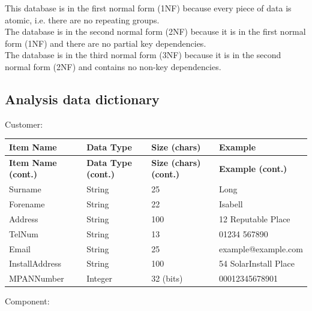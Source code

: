 This database is in the first normal form (1NF) because every piece of data is atomic, i.e. there are no repeating groups.\\
The database is in the second normal form (2NF) because it is in the first normal form (1NF) and there are no partial key dependencies.\\
The database is in the third normal form (3NF) because it is in the second normal form (2NF) and contains no non-key dependencies.
		\subsection{Analysis data dictionary}
Customer:

\begin{center}
	\begin{longtable}{ | p{4cm} | p{4cm} | p{4cm} | p{4cm} | }
		\hline
		\textbf{Item Name} & \textbf{Data Type} & \textbf{Size
(chars)} & \textbf{Example}\\
		\endfirsthead
		\hline
		\textbf{Item Name (cont.)} & \textbf{Data Type (cont.)} &
\textbf{Size (chars) (cont.)} & \textbf{Example (cont.)}\\
		\endhead
		\hline
		Surname & String & 25 & Long\\
		\hline
		Forename & String & 22 & Isabell\\
		\hline
		Address & String & 100 & 12 Reputable Place\\
		\hline
		TelNum & String & 13 & 01234 567890\\
		\hline
		Email & String & 25 & example@example.com\\
		\hline
		InstallAddress & String & 100 & 54 SolarInstall Place\\
		\hline
		MPANNumber\footnotemark & Integer & 32 (bits) & 00012345678901\\
		\hline
	\end{longtable}
\end{center}

Component:

